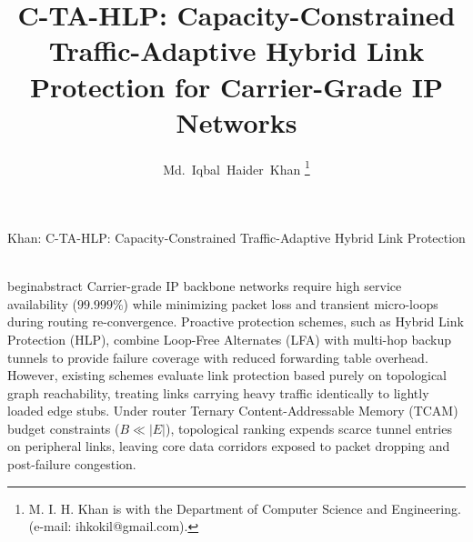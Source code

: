 \documentclass[journal]{IEEEtran}
\begin{document}
\title{C-TA-HLP: Capacity-Constrained Traffic-Adaptive Hybrid Link Protection for Carrier-Grade IP Networks}

\author{Md.~Iqbal~Haider~Khan%
\thanks{M. I. H. Khan is with the Department of Computer Science and Engineering. (e-mail: ihkokil@gmail.com).}}

%
{Khan: C-TA-HLP: Capacity-Constrained Traffic-Adaptive Hybrid Link Protection}

\maketitle

\\begin{abstract}
Carrier-grade IP backbone networks require high service availability ($99.999\%$) while minimizing packet loss and transient micro-loops during routing re-convergence. Proactive protection schemes, such as Hybrid Link Protection (HLP), combine Loop-Free Alternates (LFA) with multi-hop backup tunnels to provide failure coverage with reduced forwarding table overhead. However, existing schemes evaluate link protection based purely on topological graph reachability, treating links carrying heavy traffic identically to lightly loaded edge stubs. Under router Ternary Content-Addressable Memory (TCAM) budget constraints ($B \ll |E|$), topological ranking expends scarce tunnel entries on peripheral links, leaving core data corridors exposed to packet dropping and post-failure congestion. 
\end{document}
